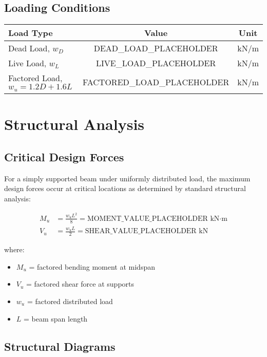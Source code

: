 \documentclass[
  11pt,
  letterpaper,
  onecolumn
]{article}
\begin{document}
\subsection{Loading Conditions}

\begin{center}
\renewcommand{\arraystretch}{1.3}
\begin{tabular}{l c c}
\toprule
\textbf{Load Type} & \textbf{Value} & \textbf{Unit} \\
\midrule
Dead Load, $w_D$ & DEAD_LOAD_PLACEHOLDER & kN/m \\
Live Load, $w_L$ & LIVE_LOAD_PLACEHOLDER & kN/m \\
Factored Load, $w_u = 1.2D + 1.6L$ & FACTORED_LOAD_PLACEHOLDER & kN/m \\
\bottomrule
\end{tabular}
\end{center}

\section{Structural Analysis}

\subsection{Critical Design Forces}

For a simply supported beam under uniformly distributed load, the maximum design forces occur at critical locations as determined by standard structural analysis:

\begin{align}
M_u &= \frac{w_u L^2}{8} = \text{MOMENT_VALUE_PLACEHOLDER kN·m} \label{eq:moment}\\
V_u &= \frac{w_u L}{2} = \text{SHEAR_VALUE_PLACEHOLDER kN} \label{eq:shear}
\end{align}

where:
\begin{itemize}
\item $M_u$ = factored bending moment at midspan
\item $V_u$ = factored shear force at supports
\item $w_u$ = factored distributed load
\item $L$ = beam span length
\end{itemize}

\subsection{Structural Diagrams}
\end{document}
